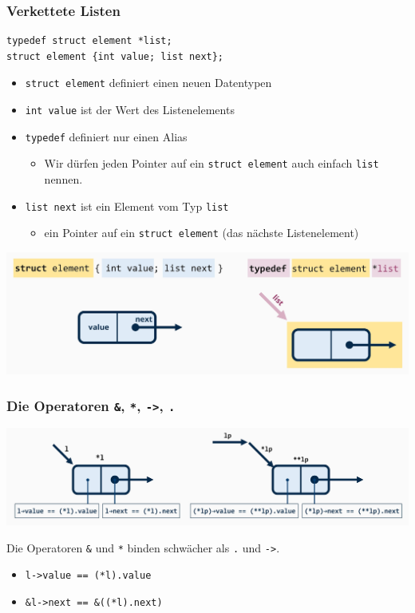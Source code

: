 \documentclass{beamer}
\begin{document}
\begin{frame}[fragile] \frametitle{Verkettete Listen}
	\footnotesize
	\begin{lstlisting}[style=notebook]
typedef struct element *list;
struct element {int value; list next};
	\end{lstlisting}
	\begin{itemize}
		\item \lstinline{struct element} definiert einen neuen Datentypen
		\item \lstinline{int value} ist der Wert des Listenelements
		\item \texttt{typedef} definiert nur einen Alias
		\begin{itemize} \scriptsize
			\item Wir dürfen jeden Pointer auf ein \lstinline{struct element} auch einfach \lstinline{list} nennen.
		\end{itemize}
		\item \lstinline{list next} ist ein Element vom Typ \lstinline{list}
		\begin{itemize} \scriptsize
			\item ein Pointer auf ein \lstinline{struct element} (das nächste Listenelement)
		\end{itemize}
	\end{itemize}
	\begin{center}
		\includegraphics[width=.8\linewidth]{tut06-graphics/tut06-liste-impl}
	\end{center}
\end{frame}

\begin{frame}[fragile] \frametitle{Die Operatoren \texttt{\&}, \texttt{*}, \texttt{->}, \texttt{.}}
	\begin{center}
		\includegraphics[width=\linewidth]{tut06-graphics/tut06-liste-zugriff}
	\end{center}

	Die Operatoren \texttt{\&} und \texttt{*} binden schwächer als \texttt{.} und \texttt{->}.
	\begin{itemize}
		\item \lstinline{l->value == (*l).value}
		\item \lstinline{&l->next == &((*l).next)}
	\end{itemize}
\end{frame}
\end{document}
